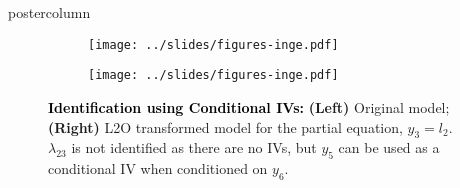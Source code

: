 \documentclass{beamer}
\begin{document}
\begin{frame}
\begin{columns}
\begin{column}{.33\textwidth}
\begin{beamercolorbox}[center]{postercolumn}
\begin{minipage}{.98\textwidth}
{\begin{myblock}{}
\begin{figure}
							\begin{subfigure}{0.5 \linewidth}
								\centering
								\texttt{[image: ../slides/figures-inge.pdf]}
							\end{subfigure}%
							\begin{subfigure}{0.5 \linewidth}
								\centering
								\texttt{[image: ../slides/figures-inge.pdf]}
							\end{subfigure}
							\caption*{\textbf{\textcolor{black}{Identification using Conditional IVs:}} \textbf{(Left)} Original model;
									\textbf{(Right)} L2O transformed model for the partial equation, $ y_3 = l_2 $. $ \lambda_{23} $ is not 
									identified as there are no IVs, but $y_5$ can be used as a conditional IV when conditioned on $ y_6 $.}						\end{figure}
					\end{myblock}\vfill
 				}
			\end{minipage}
		\end{beamercolorbox}
	\end{column}



\end{columns}
\end{frame}
\end{document}
